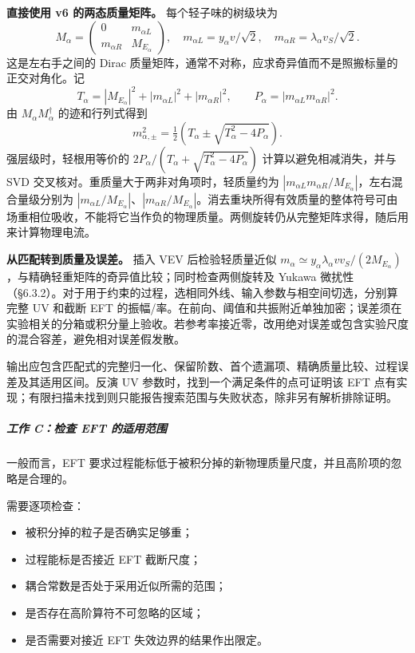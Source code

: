 \documentclass[
  chinese,
  UTF8]{ctexart}
\providecommand{\tightlist}{%
  \setlength{\itemsep}{0pt}\setlength{\parskip}{0pt}}
\begin{document}
\textbf{直接使用 v6 的两态质量矩阵。} 每个轻子味的树级块为 \[
M_\alpha=\begin{pmatrix}0&m_{\alpha L}\\m_{\alpha R}&M_{E_\alpha}\end{pmatrix},
\quad m_{\alpha L}=y_\alpha v/\sqrt2,\quad
m_{\alpha R}=\lambda_\alpha v_S/\sqrt2.
\] 这是左右手之间的 Dirac
质量矩阵，通常不对称，应求奇异值而不是照搬标量的正交对角化。记 \[
T_\alpha=|M_{E_\alpha}|^2+|m_{\alpha L}|^2+|m_{\alpha R}|^2,\qquad
P_\alpha=|m_{\alpha L}m_{\alpha R}|^2.
\] 由 \(M_\alpha M_\alpha^\dagger\) 的迹和行列式得到 \[
m_{\alpha,\pm}^2=\tfrac12\left(T_\alpha\pm
\sqrt{T_\alpha^2-4P_\alpha}\right).
\] 强层级时，轻根用等价的
\(2P_\alpha/(T_\alpha+\sqrt{T_\alpha^2-4P_\alpha})\)
计算以避免相减消失，并与 SVD
交叉核对。重质量大于两非对角项时，轻质量约为
\(|m_{\alpha L}m_{\alpha R}/M_{E_\alpha}|\)，左右混合量级分别为
\(|m_{\alpha L}/M_{E_\alpha}|\)、\(|m_{\alpha R}/M_{E_\alpha}|\)。消去重块所得有效质量的整体符号可由场重相位吸收，不能将它当作负的物理质量。两侧旋转仍从完整矩阵求得，随后用来计算物理电流。

\textbf{从匹配转到质量及误差。} 插入 VEV 后检验轻质量近似
\(m_\alpha\simeq y_\alpha\lambda_\alpha vv_S/(2M_{E_\alpha})\)，与精确轻重矩阵的奇异值比较；同时检查两侧旋转及
Yukawa
微扰性（§6.3.2）。对于用于约束的过程，选相同外线、输入参数与相空间切选，分别算完整
UV 和截断 EFT
的振幅/率。在前向、阈值和共振附近单独加密；误差须在实验相关的分箱或积分量上验收。若参考率接近零，改用绝对误差或包含实验尺度的混合容差，避免相对误差假发散。

输出应包含匹配式的完整归一化、保留阶数、首个遗漏项、精确质量比较、过程误差及其适用区间。反演
UV 参数时，找到一个满足条件的点可证明该 EFT
点有实现；有限扫描未找到则只能报告搜索范围与失败状态，除非另有解析排除证明。

\subparagraph{工作 C：检查 EFT
的适用范围}\label{ux5de5ux4f5c-cux68c0ux67e5-eft-ux7684ux9002ux7528ux8303ux56f4}

一般而言，EFT
要求过程能标低于被积分掉的新物理质量尺度，并且高阶项的忽略是合理的。

需要逐项检查：

\begin{itemize}
\tightlist
\item
  被积分掉的粒子是否确实足够重；
\item
  过程能标是否接近 EFT 截断尺度；
\item
  耦合常数是否处于采用近似所需的范围；
\item
  是否存在高阶算符不可忽略的区域；
\item
  是否需要对接近 EFT 失效边界的结果作出限定。
\end{itemize}
\end{document}
